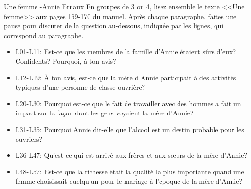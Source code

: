 \begin{frame}{Une femme -Annie Ernaux}
  \footnotesize
  En groupes de 3 ou 4, lisez ensemble le texte <<Une femme>> aux pages 169-170 du manuel.
  Après chaque paragraphe, faites une pause pour discuter de la question au-dessous, indiquée par les lignes, qui correspond au paragraphe.
  \begin{itemize}
    \item[] L01-L11: Est-ce que les membres de la famille d'Annie étaient sûrs d'eux? Confidents? Pourquoi, à ton avis?
    \item[] L12-L19: À ton avis, est-ce que la mère d'Annie participait à des activités typiques d'une personne de classe ouvrière?
    \item[] L20-L30: Pourquoi est-ce que le fait de travailler avec des hommes a fait un impact sur la façon dont les gens voyaient la mère d'Annie?
    \item[] L31-L35: Pourquoi Annie dit-elle que l'alcool est un destin probable pour les ouvriers?
    \item[] L36-L47: Qu'est-ce qui est arrivé aux frères et aux sœurs de la mère d'Annie?
    \item[] L48-L57: Est-ce que la richesse était la qualité la plus importante quand une femme choisissait quelqu'un pour le mariage à l'époque de la mère d'Annie?
  \end{itemize}
\end{frame}